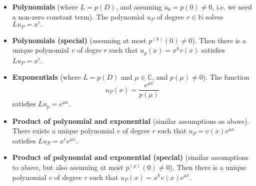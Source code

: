 \begin{itemize}
    \item \textbf{Polynomials} (where $L = p(D)$, and assuming $a_0 = p(0) \neq 0$, i.e. we need a non-zero constant term). The polynomial $u_P$ of degree $r \in \mathbb{N}$ solves $ Lu_P = x^r . $
    \item \textbf{Polynomials (special)} (assuming at most $p^{(k)}(0) \neq 0$). Then there is a unique polynomial $v$ of degre $r$ such that $u_p(x)= x^k v(x)$ satisfies $Lu_P = x^r$.
    \item \textbf{Exponentials} (where $L = p(D)$ and $\mu \in \mathbb{C}$, and $p(\mu) \neq 0$). The function
        $$ u_P(x) = \frac{e^{\mu x}}{p(\mu)} $$
    satisfies $Lu_p = e^{\mu x}$.
    \item \textbf{Product of polynomial and exponential} (similar assumptions as above). There exists a unique polynomial $v$ of degree $r$ such that $u_P = v(x) e^{\mu x}$ satisfies $Lu_P = x^r e^{\mu x}$.
    \item \textbf{Product of polynomial and exponential (special)} (similar assumptions to above, but also assuming at most $p^{(\mu)}(0) \neq 0$). Then there is a unique polynomial $v$ of degree $r$ such that $u_P(x) = x^k v(x) e^{\mu x}$.
\end{itemize}

